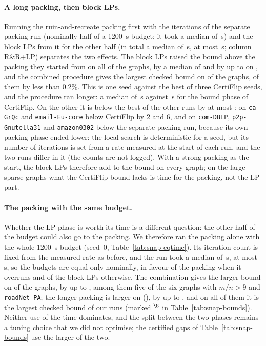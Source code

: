 \paragraph{A long packing, then block LPs.}  Running the ruin-and-recreate packing first with
the iterations of the separate packing run (nominally half of a
\SI{1200}{s} budget; it took a median of \numPlpPackTimeMedian{}\,s) and the
block LPs from it for the other half (in total a median of
\numPlpTimeMedian{}\,s, at most \numPlpTimeMax{}\,s; column R\&R+LP) separates
the two effects.  The block LPs raised the bound above
the packing they started from on all \numPlpGainPos{} of the \numPlpN{} graphs,
by a median of \numPlpGainMedian{} and by up to \numPlpGainMax{} on
\numPlpGainMaxGraph{}, and the combined procedure gives the largest checked
bound on \numPlpBetter{} of the \numPlpN{} graphs, \numPlpSmallWins{} of them by less than
0.2\%.  This is one seed against the best of three CertiFlip seeds, and the
procedure ran longer: a median of \numPlpTimeMedian{}\,s against
\numCfLbTimeMedian{}\,s for the bound phase of CertiFlip.  On the other
\numPlpBelow{} it is below the best of the other runs by at most
\numPlpBelowMax{}: on \texttt{ca-GrQc} and \texttt{email-Eu-core} below
CertiFlip by 2 and 6, and on \texttt{com-DBLP}, \texttt{p2p-Gnutella31} and
\texttt{amazon0302} below the separate packing run, because its own packing
phase ended lower: the local search is deterministic for a seed, but its
number of iterations is set from a rate measured at the start of each run,
and the two runs differ in it (the counts are not logged).  With a
strong packing as the start, the block LPs therefore add to the bound on
every graph; on the large sparse graphs what the CertiFlip bound lacks is
time for the packing, not the LP part.

\paragraph{The packing with the same budget.}  Whether the LP phase is worth
its time is a different question: the other half of the budget could also go
to the packing.  We therefore ran the packing alone with the whole
\SI{1200}{s} budget (seed~0, Table~\ref{tab:snap-eqtime}).  Its iteration
count is fixed from the measured rate as before, and the run took a median
of \numEqTimeMedian{}\,s, at most \numEqTimeMax{}\,s, so the budgets are
equal only nominally, in favour of the packing when it overruns and of the
block LPs otherwise.  The combination gives the larger bound on
\numEqPlpBetter{} of the \numEqN{} graphs, by up to \numEqPlpBetterMax{},
among them five of the six graphs with $m/n>9$ and \texttt{roadNet-PA}; the longer packing is larger on
\numEqPackBetter{} (\numEqPackBetterList{}), by up to \numEqPackBetterMax{},
and on all of them it is the largest checked bound of our runs (marked
$^\S$ in Table~\ref{tab:snap-bounds}).  Neither use of the time dominates,
and the split between the two phases remains a tuning choice that we did not
optimise; the certified gaps of Table~\ref{tab:snap-bounds} use the larger of
the two.

